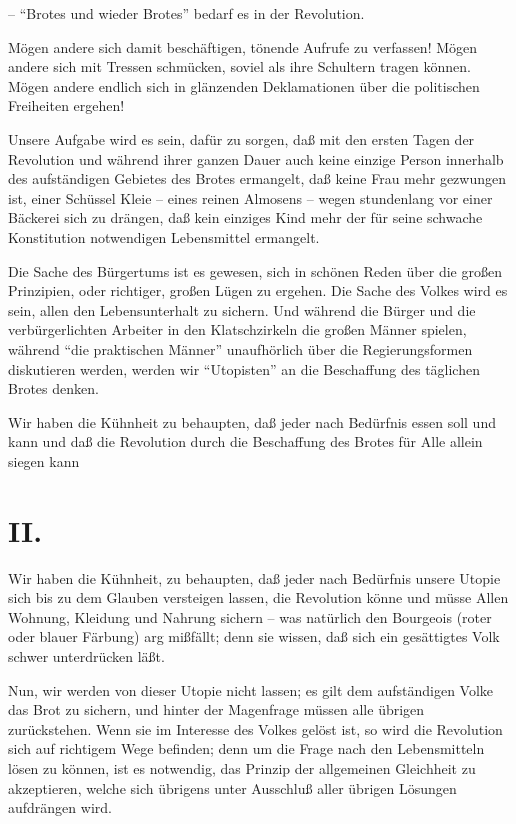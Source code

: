 \documentclass{scrbook}
\begin{document}
– ``Brotes und wieder Brotes'' bedarf es in der Revolution.

Mögen andere sich damit beschäftigen, tönende Aufrufe zu verfassen! Mögen andere sich mit Tressen schmücken, soviel als ihre Schultern tragen können. Mögen andere endlich sich in glänzenden Deklamationen über die politischen Freiheiten ergehen!

Unsere Aufgabe wird es sein, dafür zu sorgen, daß mit den ersten Tagen der Revolution und während ihrer ganzen Dauer auch keine einzige Person innerhalb des aufständigen Gebietes des Brotes ermangelt, daß keine Frau mehr gezwungen ist, einer Schüssel Kleie – eines reinen Almosens – wegen stundenlang vor einer Bäckerei sich zu drängen, daß kein einziges Kind mehr der für seine schwache Konstitution notwendigen Lebensmittel ermangelt.

Die Sache des Bürgertums ist es gewesen, sich in schönen Reden über die großen Prinzipien, oder richtiger, großen Lügen zu ergehen. Die Sache des Volkes wird es sein, allen den Lebensunterhalt zu sichern. Und während die Bürger und die verbürgerlichten Arbeiter in den Klatschzirkeln die großen Männer spielen, während ``die praktischen Männer'' unaufhörlich über die Regierungsformen diskutieren werden, werden wir ``Utopisten'' an die Beschaffung des täglichen Brotes denken.

Wir haben die Kühnheit zu behaupten, daß jeder nach Bedürfnis essen soll und kann und daß die Revolution durch die Beschaffung des Brotes für Alle allein siegen kann

\section*{II.}

Wir haben die Kühnheit, zu behaupten, daß jeder nach Bedürfnis unsere Utopie sich bis zu dem Glauben versteigen lassen, die Revolution könne und müsse Allen Wohnung, Kleidung und Nahrung sichern – was natürlich den Bourgeois (roter oder blauer Färbung) arg mißfällt; denn sie wissen, daß sich ein gesättigtes Volk schwer unterdrücken läßt.

Nun, wir werden von dieser Utopie nicht lassen; es gilt dem aufständigen Volke das Brot zu sichern, und hinter der Magenfrage müssen alle übrigen zurückstehen. Wenn sie im Interesse des Volkes gelöst ist, so wird die Revolution sich auf richtigem Wege befinden; denn um die Frage nach den Lebensmitteln lösen zu können, ist es notwendig, das Prinzip der allgemeinen Gleichheit zu akzeptieren, welche sich übrigens unter Ausschluß aller übrigen Lösungen aufdrängen wird.
\end{document}
